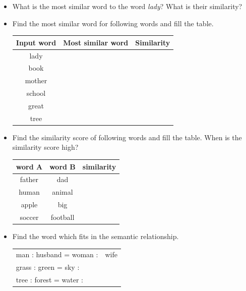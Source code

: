 \documentclass[12pt,fleqn]{article}
\begin{document}
\begin{enumerate}
\begin{itemize} 
 \item What is the most similar word to the word \textit{lady}? What is their similarity? 
 \item Find the most similar word for following words and fill the table. 
 \begin{table}[h] 
  \begin{center} 
     \begin{tabular}{c|c|c}
      Input word & Most similar word & Similarity \\  \hline 
      lady & & \\ 
      book & & \\ 
      mother & & \\ 
      school & & \\ 
      great & & \\ 
      tree & & \\ 
     \end{tabular}
  \end{center}
\end{table}
\item Find the similarity score of following words and fill the table. When is the similarity score high? 
\begin{table}[h] 
   \begin{center} 
         \begin{tabular}{c|c|c}
          word A & word B & similarity \\  \hline 
          father & dad &  \\ 
          human & animal &  \\ 
          apple & big & \\ 
          soccer & football & \\ 
         \end{tabular}
   \end{center}
\end{table}

\item Find the word which fits in the semantic relationship.

\begin{table}[h] 
   \begin{center} 
         \begin{tabular}{lc}
man : husband = woman :& wife \\ 
grass : green = sky : & \\ 
tree : forest = water : & \\ 
         \end{tabular}
   \end{center}
\end{table}
\end{itemize}
\end{enumerate}  
\end{document}
